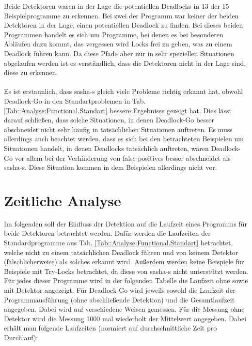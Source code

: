 Beide Detektoren waren in der Lage die potentiellen Deadlocks in 13 der 15 
Beispielprogramme zu erkennen. Bei zwei der Programm war keiner der beiden Detektoren 
in der Lage, einen potentiellen Deadlock zu finden. Bei dieses beiden 
Programmen handelt es sich um Programme, bei denen es bei besonderen 
Abläufen dazu kommt, das vergessen wird Locks frei zu geben, was zu einem Deadlock 
führen kann. Da diese Pfade aber nur in sehr speziellen Situationen abgelaufen 
werden ist es verständlich, dass die Detektoren nicht in der Lage sind, diese 
zu erkennen.\\\\
Es ist erstaunlich, dass sasha-s gleich viele Probleme richtig erkannt hat, obwohl 
Deadlock-Go in den Standartproblemen in Tab. \ref{Tab::Analyse:Functional.Standart}
bessere Ergebnisse gezeigt hat. Dies lässt darauf schließen, dass solche 
Situationen, in denen Deadlock-Go besser abschneidet nicht sehr häufig 
in tatsächlichen Situationen auftreten. Es muss allerdings auch beachtet werden, 
dass es sich bei den betrachteten Beispielen um Situationen handelt, in denen
Deadlocks tatsächlich auftreten, wären Deadlock-Go vor allem bei der 
Verhinderung von false-positives besser abschneidet als sasha-s. Diese 
Situation kommen in dem Beispielen allerdings nicht vor.


\section{Zeitliche Analyse}
Im folgenden soll der Einfluss der Detektion auf die Laufzeit eines Programms 
für beide Detektoren betrachtet werden. Dafür werden die Laufzeiten der 
Standardprogramme aus Tab. \ref{Tab::Analyse:Functional.Standart} betrachtet, 
welche nicht zu einem tatsächlichen Deadlock führen und von keinem Detektor 
(fälschlicherweise) als solches erkannt wird. Außerdem werden keine Beispiele 
für Beispiele mit Try-Locks betrachtet, da diese von sasha-s nicht unterstützt werden.\\ 
Für jedes dieser Programme 
wird in der folgenden Tabelle die Laufzeit ohne sowie mit Detektor angezeigt.
Für Deadlock-Go wird jeweils sowohl die Laufzeit der Programmausführung (ohne 
abschließende Detektion) und die Gesamtlaufzeit angegeben. Dabei wird auf verschiedene 
Weisen gemessen. Für die Messung ohne Detektor wird die Messung 1000 mal wiederholt
der Mittelwert angegeben. Dabei erhält man folgende Laufzeiten 
(normiert auf durchschnittliche Zeit pro Durchlauf):

